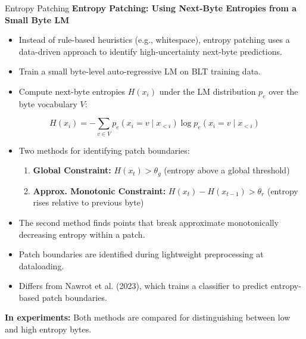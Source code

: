 \begin{frame}[allowframebreaks]{Entropy Patching}
    \textbf{Entropy Patching: Using Next-Byte Entropies from a Small Byte LM}
    \begin{itemize}
        \item Instead of rule-based heuristics (e.g., whitespace), entropy patching uses a data-driven approach to identify high-uncertainty next-byte predictions.
        \item Train a small byte-level auto-regressive LM on BLT training data.
        \item Compute next-byte entropies $H(x_i)$ under the LM distribution $p_e$ over the byte vocabulary $V$:
    \end{itemize}
    \begin{equation}
        H(x_i) = -\sum_{v \in V} p_e(x_i = v \mid x_{<i}) \log p_e(x_i = v \mid x_{<i})
    \end{equation}
\framebreak
    \begin{itemize}
        \item Two methods for identifying patch boundaries:
        \begin{enumerate}
            \item \textbf{Global Constraint:} $H(x_t) > \theta_g$ (entropy above a global threshold)
            \item \textbf{Approx. Monotonic Constraint:} $H(x_t) - H(x_{t-1}) > \theta_r$ (entropy rises relative to previous byte)
        \end{enumerate}
        \item The second method finds points that break approximate monotonically decreasing entropy within a patch.
        \item Patch boundaries are identified during lightweight preprocessing at dataloading.
        \item Differs from Nawrot et al. (2023), which trains a classifier to predict entropy-based patch boundaries.
    \end{itemize}
    \vspace{1em}
    \textbf{In experiments:} Both methods are compared for distinguishing between low and high entropy bytes.
\end{frame}


